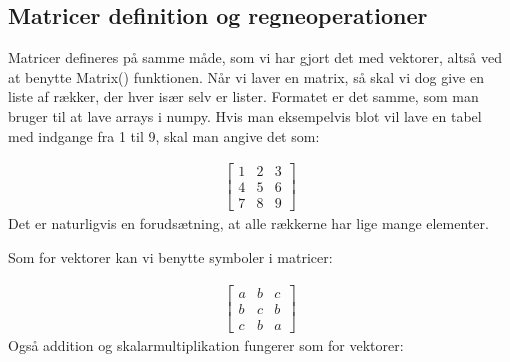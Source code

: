 \documentclass[letterpaper,10pt,english]{jupyterBook}
\begin{document}
\subsection{Matricer \sphinxhyphen{} definition og regneoperationer}
\label{\detokenize{notebooks/sympy/Notebook_LinAlg1:matricer-definition-og-regneoperationer}}
Matricer defineres på samme måde, som vi har gjort det med vektorer, altså ved at benytte Matrix() \sphinxhyphen{} funktionen. Når vi laver en matrix, så skal vi dog give en liste af rækker, der hver især selv er lister. Formatet er det samme, som man bruger til at lave arrays i numpy. Hvis man eksempelvis blot vil lave en tabel med indgange fra 1 til 9, skal man angive det som:

\begin{sphinxVerbatim}[commandchars=\\\{\}]
  \PYG{p}{[}\PYG{p}{[}  \PYG{p}{]} \PYG{p}{[}  \PYG{p}{]} \PYG{p}{[}  \PYG{p}{]}\PYG{p}{]}
\end{sphinxVerbatim}
\begin{equation*}
\begin{split}\displaystyle \left[\begin{matrix}1 & 2 & 3\\4 & 5 & 6\\7 & 8 & 9\end{matrix}\right]\end{split}
\end{equation*}
Det er naturligvis en forudsætning, at alle rækkerne har lige mange elementer.

Som for vektorer kan vi benytte symboler i matricer:

\begin{sphinxVerbatim}[commandchars=\\\{\}]
  \PYG{p}{[}\PYG{p}{[}  \PYG{p}{]} \PYG{p}{[}  \PYG{p}{]} \PYG{p}{[}  \PYG{p}{]}\PYG{p}{]}
\end{sphinxVerbatim}
\begin{equation*}
\begin{split}\displaystyle \left[\begin{matrix}a & b & c\\b & c & b\\c & b & a\end{matrix}\right]\end{split}
\end{equation*}
Også addition og skalarmultiplikation fungerer som for vektorer:
\end{document}
